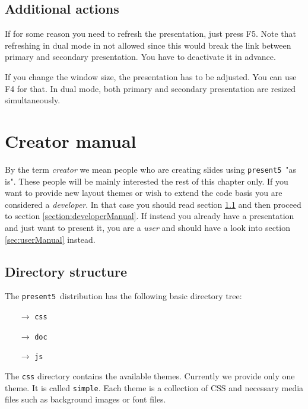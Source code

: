 \documentclass{scrartcl}
\newcommand{\present}{\code{present5}}
\newcommand{\code}[1]{{\tt #1}}
\newcommand{\folder}{$\rightarrow$}
\begin{document}
\subsection{Additional actions}
\label{subsection:additionActions}

If for some reason you need to refresh the presentation, just press F5. Note that refreshing in dual mode in not allowed since this would break the link between primary and secondary presentation. You have to deactivate it in advance.

If you change the window size, the presentation has to be adjusted. You can use F4 for that. In dual mode, both primary and secondary presentation are resized simultaneously.







\section{Creator manual}
\label{section:creatorManual} 


By the term \emph{creator} we mean people who are creating slides using \present~"as is". These people will be mainly interested the rest of this chapter only. If you want to provide new layout themes or wish to extend the code basis you are considered a \emph{developer}. In that case you should read section \ref{subsection:directoryStructure}  and then proceed to section \ref{section:developerManual}. If instead you already have a presentation and just want to present it, you are a \emph{user} and should have a look into section \ref{sec:userManual} instead.


\subsection{Directory structure}
\label{subsection:directoryStructure}

The \present~distribution has the following basic directory tree:
\begin{itemize}
	\item[\folder] \code{css}
	\item[\folder] \code{doc}
	\item[\folder] \code{js}
\end{itemize}
The \code{css} directory contains the available themes. Currently we provide only one theme. It is called \code{simple}. Each theme is a collection of CSS and necessary media files such as background images or font files.
\end{document}
